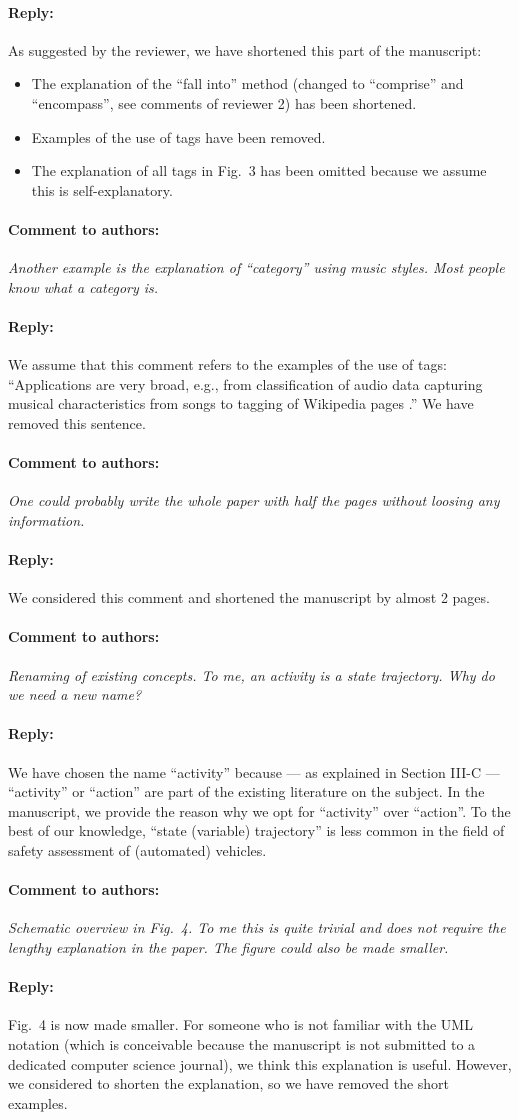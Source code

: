 \documentclass[10pt,final,a4paper,oneside,onecolumn]{article}
\newcommand{\toauthor}{\paragraph*{Comment to authors:} \itshape}
\newcommand{\fromauthor}{\paragraph*{Reply:} \normalfont}
\newcommand{\cstart}{\cbstart\color{red}}
\newcommand{\cend}{\cbend\color{black}}
\begin{document}
\fromauthor As suggested by the reviewer, we have shortened this part of the manuscript:
\begin{itemize}
	\item The explanation of the ``fall into'' method (changed to \cstart ``comprise'' \cend and \cstart ``encompass''\cend, see comments of reviewer 2) has been shortened.
	\item Examples of the use of tags have been removed.
	\item The explanation of all tags in Fig.~3 has been omitted because we assume this is self-explanatory.
\end{itemize}



\toauthor Another example is the explanation of ``category'' using music styles. Most people know what a category is.  

\fromauthor We assume that this comment refers to the examples of the use of tags: ``Applications are very broad, e.g., from classification of audio data \autocite{kong2017joint} capturing musical characteristics from songs \autocite{ellis2011semantic} to tagging of Wikipedia pages \autocite{voss2006collaborative}.'' We have removed this sentence.



\toauthor One could probably write the whole paper with half the pages without loosing any information.

\fromauthor We considered this comment and shortened the manuscript by almost 2 pages.



\toauthor Renaming of existing concepts. To me, an activity is a state trajectory. Why do we need a new name?

\fromauthor We have chosen the name ``activity'' because --- as explained in Section III-C --- ``activity'' \autocite{elrofai2018scenario,catapult2018musicc} or ``action'' \autocite{ulbrich2015} are part of the existing literature on the subject. In the manuscript, we provide the reason why we opt for ``activity'' over ``action''. To the best of our knowledge, ``state (variable) trajectory'' is less common in the field of safety assessment of (automated) vehicles.



\toauthor Schematic overview in Fig.~4. To me this is quite trivial and does not require the lengthy explanation in the paper. The figure could also be made smaller.

\fromauthor Fig.~4 is now made smaller. For someone who is not familiar with the UML notation (which is conceivable because the manuscript is not submitted to a dedicated computer science journal), we think this explanation is useful. However, we considered to shorten the explanation, so we have removed the short examples.
\end{document}
